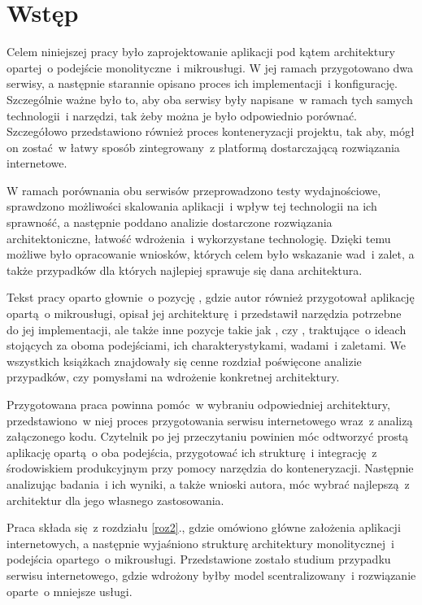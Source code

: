 \chapter{Wstęp}
Celem niniejszej pracy było zaprojektowanie aplikacji pod kątem architektury opartej~o podejście monolityczne~i mikrousługi. W jej ramach przygotowano dwa serwisy, a następnie starannie opisano proces ich implementacji~i konfigurację. Szczególnie ważne było to, aby oba serwisy były napisane~w ramach tych samych technologii~i narzędzi, tak żeby można je było odpowiednio porównać. Szczegółowo przedstawiono również proces konteneryzacji projektu, tak aby, mógł on zostać~w łatwy sposób zintegrowany~z platformą dostarczającą rozwiązania internetowe.

W ramach porównania obu serwisów przeprowadzono testy wydajnościowe, sprawdzono możliwości skalowania aplikacji~i wpływ tej technologii na ich sprawność, a następnie poddano analizie dostarczone rozwiązania architektoniczne, łatwość wdrożenia~i wykorzystane technologię. Dzięki temu możliwe było opracowanie wniosków, których celem było wskazanie wad~i zalet, a także przypadków dla których najlepiej sprawuje się dana architektura.

Tekst pracy oparto głownie~o pozycję \cite{Ziade:2018}, gdzie autor również przygotował aplikację opartą~o mikrousługi, opisał jej architekturę~i przedstawił narzędzia potrzebne do jej implementacji, ale także inne pozycje takie jak \cite{Rodger:2019}, czy \cite{Folwer:2019}, traktujące~o ideach stojących za oboma podejściami, ich charakterystykami, wadami~i zaletami. We wszystkich książkach znajdowały się cenne rozdział poświęcone analizie przypadków, czy pomysłami na wdrożenie konkretnej architektury.

Przygotowana praca powinna pomóc~w wybraniu odpowiedniej architektury, przedstawiono~w niej proces przygotowania serwisu internetowego wraz~z analizą załączonego kodu. Czytelnik po jej przeczytaniu powinien móc odtworzyć prostą aplikację opartą~o oba podejścia, przygotować ich strukturę~i integrację~z środowiskiem produkcyjnym przy pomocy narzędzia do konteneryzacji. Następnie analizując badania~i ich wyniki, a także wnioski autora, móc wybrać najlepszą~z architektur dla jego własnego zastosowania.

Praca składa się~z rozdziału \ref{roz2}., gdzie omówiono główne założenia aplikacji internetowych, a następnie wyjaśniono strukturę architektury monolitycznej~i podejścia opartego~o mikrousługi. Przedstawione zostało studium przypadku serwisu internetowego, gdzie wdrożony byłby model scentralizowany~i rozwiązanie oparte~o mniejsze usługi.

